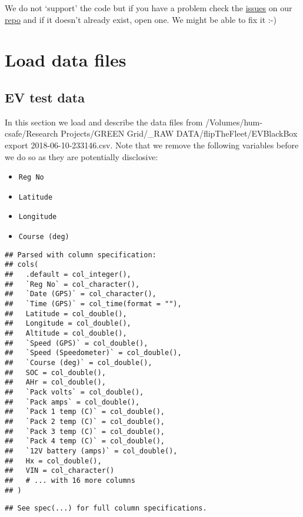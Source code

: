 \documentclass[]{article}
\providecommand{\tightlist}{%
  \setlength{\itemsep}{0pt}\setlength{\parskip}{0pt}}
\begin{document}
We do not `support' the code but if you have a problem check the
\href{https://git.soton.ac.uk/ba1e12/nzGREENGrid/issues}{issues} on our
\href{https://git.soton.ac.uk/ba1e12/nzGREENGrid}{repo} and if it
doesn't already exist, open one. We might be able to fix it :-)

\section{Load data files}\label{load-data-files}

\subsection{EV test data}\label{ev-test-data}

In this section we load and describe the data files from
/Volumes/hum-csafe/Research Projects/GREEN Grid/\_RAW
DATA/flipTheFleet/EVBlackBox export 2018-06-10-233146.csv. Note that we
remove the following variables before we do so as they are potentially
disclosive:

\begin{itemize}
\tightlist
\item
  \texttt{Reg\ No}
\item
  \texttt{Latitude}
\item
  \texttt{Longitude}
\item
  \texttt{Course\ (deg)}
\end{itemize}

\begin{verbatim}
## Parsed with column specification:
## cols(
##   .default = col_integer(),
##   `Reg No` = col_character(),
##   `Date (GPS)` = col_character(),
##   `Time (GPS)` = col_time(format = ""),
##   Latitude = col_double(),
##   Longitude = col_double(),
##   Altitude = col_double(),
##   `Speed (GPS)` = col_double(),
##   `Speed (Speedometer)` = col_double(),
##   `Course (deg)` = col_double(),
##   SOC = col_double(),
##   AHr = col_double(),
##   `Pack volts` = col_double(),
##   `Pack amps` = col_double(),
##   `Pack 1 temp (C)` = col_double(),
##   `Pack 2 temp (C)` = col_double(),
##   `Pack 3 temp (C)` = col_double(),
##   `Pack 4 temp (C)` = col_double(),
##   `12V battery (amps)` = col_double(),
##   Hx = col_double(),
##   VIN = col_character()
##   # ... with 16 more columns
## )
\end{verbatim}

\begin{verbatim}
## See spec(...) for full column specifications.
\end{verbatim}
\end{document}
